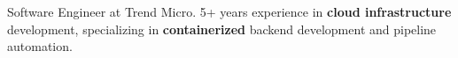 \par{
  Software Engineer at Trend Micro. 5+ years experience in \textbf{cloud infrastructure} development, specializing in \textbf{containerized} backend development and pipeline automation.
}
